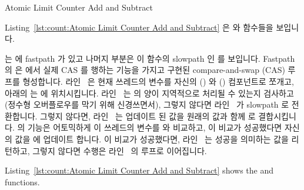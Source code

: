 \begin{listing}[tbp]

\caption{Atomic Limit Counter Add and Subtract}
\label{lst:count:Atomic Limit Counter Add and Subtract}
\end{listing}

Listing~\ref{lst:count:Atomic Limit Counter Add and Subtract}
은  와  함수들을 보입니다.

\begin{fcvref}
 는  에 fastpath 가 있고
나머지 부분은 이 함수의 slowpath 인  를 보입니다.
Fastpath 의  은  에서
실제 CAS 를 행하는  기능을 가지고 구현된 compare-and-swap
(CAS) 루프를 형성합니다.
라인~ 은 현재 쓰레드의  변수를 자신의
 () 와  () 컴포넌트로 쪼개고, 아래의
 는  에 위치시킵니다.
라인~ 는  의 양이 지역적으로 처리될 수 있는지 검사하고
(정수형 오버플로우를 막기 위해 신경쓰면서), 그렇지 않다면 라인~ 가
slowpath 로 전환합니다.
그렇지 않다면, 라인~ 는 업데이트 된  값을 원래의
 값과 함께  로 결합시킵니다.
 의  기능은 어토믹하게 이
쓰레드의  변수를  와 비교하고, 이 비교가 성공했다면
자신의 값을  에 업데이트 합니다.
이 비교가 성공했다면, 라인~ 는 성공을 의미하는 값을 리턴하고,
그렇지 않다면 수행은 라인~ 의 루프로 이어집니다.
\end{fcvref}

\iffalse

Listing~\ref{lst:count:Atomic Limit Counter Add and Subtract}
shows the  and  functions.


